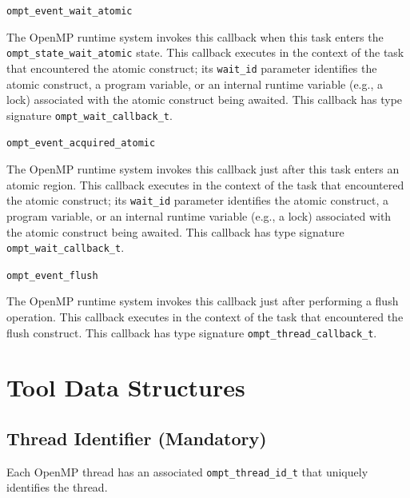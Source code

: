 \documentclass{article}
\newcommand{\descheader}[1]{{\needspace{3\baselineskip}\vspace{1em}\noindent \fbox{#1}}}
\begin{document}
\descheader{Atomic Blocks}

\begin{description}

\item \verb|ompt_event_wait_atomic|

   The OpenMP runtime system invokes this callback when this task
   enters the \verb|ompt_state_wait_atomic| state.  This callback executes
   in the context of the task that encountered the atomic construct; its \verb|wait_id| parameter identifies
   the atomic construct, a program variable, or an internal runtime variable (e.g., a lock) associated with the atomic construct being awaited.
   This callback has type signature \verb|ompt_wait_callback_t|. 

\item \verb|ompt_event_acquired_atomic|

\sloppy
   The OpenMP runtime system invokes this callback just after this
   task enters an atomic region.  This callback executes in the
   context of the task that encountered the atomic construct; its \verb|wait_id| parameter identifies the
   atomic construct, a program variable, or an internal runtime variable (e.g., a lock) associated with the atomic construct being awaited.
   This callback has type signature \verb|ompt_wait_callback_t|. 

\end{description}

\descheader{Miscellaneous}

\begin{description}

\item \verb|ompt_event_flush|

 \sloppy
   The OpenMP runtime system invokes this callback just after
   performing a flush operation.  This callback executes in the
   context of the task that encountered the flush construct.
   This callback has type signature \verb|ompt_thread_callback_t|. 

\end{description}



\section{Tool Data Structures}
\label{sec:data}

\subsection{Thread Identifier (Mandatory)}
  Each OpenMP thread  has an associated
  \verb|ompt_thread_id_t| that uniquely identifies the thread. 
\end{document}
